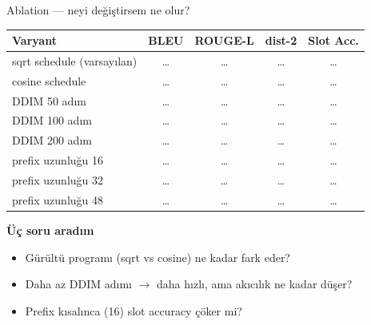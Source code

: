 \documentclass[10pt,aspectratio=169]{beamer}
\begin{document}
\begin{frame}{Ablation --- neyi değiştirsem ne olur?}
  \begin{table}
    \centering
    \footnotesize
    \renewcommand{\arraystretch}{1.15}
    \begin{tabular}{lcccc}
      \toprule
      Varyant & BLEU & ROUGE-L & dist-2 & Slot Acc. \\
      \midrule
      sqrt schedule (varsayılan) & \dots & \dots & \dots & \dots \\
      cosine schedule            & \dots & \dots & \dots & \dots \\
      DDIM 50 adım               & \dots & \dots & \dots & \dots \\
      DDIM 100 adım              & \dots & \dots & \dots & \dots \\
      DDIM 200 adım              & \dots & \dots & \dots & \dots \\
      prefix uzunluğu 16         & \dots & \dots & \dots & \dots \\
      prefix uzunluğu 32         & \dots & \dots & \dots & \dots \\
      prefix uzunluğu 48         & \dots & \dots & \dots & \dots \\
      \bottomrule
    \end{tabular}
  \end{table}

  \textbf{Üç soru aradım}
  \begin{itemize}
    \item Gürültü programı (sqrt vs cosine) ne kadar fark eder?
    \item Daha az DDIM adımı $\to$ daha hızlı, ama akıcılık ne kadar düşer?
    \item Prefix kısalınca (16) slot accuracy çöker mi?
  \end{itemize}
\end{frame}
\end{document}
